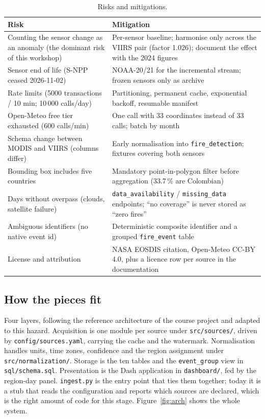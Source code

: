 \documentclass[11pt,a4paper]{article}
\newcommand{\code}[1]{\texttt{\small #1}}
\begin{document}
\begin{table}[h]
\centering
\small
\begin{tabular}{L{5.4cm}L{9.4cm}}
\toprule
\textbf{Risk} & \textbf{Mitigation} \\
\midrule
Counting the sensor change as an anomaly (the dominant risk of this workshop) & Per-sensor baseline; harmonise only across the VIIRS pair (factor 1.026); document the effect with the 2024 figures \\
Sensor end of life (S-NPP ceased 2026-11-02) & NOAA-20/21 for the incremental stream; frozen sensors only as archive \\
Rate limits (5000 transactions / 10 min; 10\,000 calls/day) & Partitioning, permanent cache, exponential backoff, resumable manifest \\
Open-Meteo free tier exhausted (600 calls/min) & One call with 33 coordinates instead of 33 calls; batch by month \\
Schema change between MODIS and VIIRS (columns differ) & Early normalisation into \code{fire\_detection}; fixtures covering both sensors \\
Bounding box includes five countries & Mandatory point-in-polygon filter before aggregation (33.7\,\% are Colombian) \\
Days without overpass (clouds, satellite failure) & \code{data\_availability} / \code{missing\_data} endpoints; ``no coverage'' is never stored as ``zero fires'' \\
Ambiguous identifiers (no native event id) & Deterministic composite identifier and a grouped \code{fire\_event} table \\
License and attribution & NASA EOSDIS citation, Open-Meteo CC-BY 4.0, plus a licence row per source in the documentation \\
\bottomrule
\end{tabular}
\caption{Risks and mitigations.}
\end{table}

\subsection{How the pieces fit}

Four layers, following the reference architecture of the course project and adapted to this hazard.
Acquisition is one module per source under \code{src/sources/}, driven by \code{config/sources.yaml},
carrying the cache and the watermark. Normalisation handles units, time zones, confidence and the
region assignment under \code{src/normalization/}. Storage is the ten tables and the
\code{event\_group} view in \code{sql/schema.sql}. Presentation is the Dash application in \code{dashboard/}, fed by the
region-day panel. \code{ingest.py} is the entry point that ties them together; today it is a stub
that reads the configuration and reports which sources are declared, which is the right amount of
code for this stage. Figure~\ref{fig:arch} shows the whole system.
\end{document}
